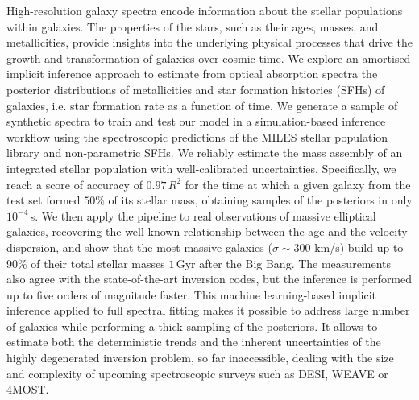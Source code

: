 \documentclass{aa}
\begin{document}
  \abstract
   {High-resolution galaxy spectra encode information about the stellar populations within galaxies. The properties of the stars, such as their ages, masses,  and metallicities, provide  insights into the underlying physical processes that drive the growth and transformation of galaxies over cosmic time.
    We explore an amortised implicit inference approach to estimate from optical absorption spectra the posterior distributions of metallicities and star formation histories (SFHs) of galaxies, i.e. star formation rate as a function of time. 
    We generate a sample of synthetic spectra to train and test our model in a simulation-based inference workflow using the spectroscopic predictions of the MILES stellar population library and non-parametric SFHs. We reliably estimate the mass assembly of an integrated stellar population with well-calibrated uncertainties. Specifically, we reach a score of accuracy of $0.97\,R^2$ for the time at which a given galaxy from the test set formed $50\%$ of its stellar mass, obtaining samples of the posteriors in only $10^{-4}$\,s. We then apply the pipeline to real observations of  massive elliptical galaxies, recovering the well-known relationship between the age and the velocity dispersion, and show that the most massive galaxies ($\sigma\sim300$ km/s) build up to 90\% of their total stellar masses $1$\,Gyr after the Big Bang. The measurements also agree with the state-of-the-art inversion codes, but the inference is performed up to five orders of magnitude faster.
    This machine learning-based implicit inference applied to full spectral fitting makes it possible to address large number of galaxies while performing a thick sampling of the posteriors. It allows to estimate both the deterministic trends and the inherent uncertainties of the highly degenerated inversion problem, so far inaccessible, dealing with the size and complexity of upcoming spectroscopic surveys such as DESI, WEAVE or 4MOST.}
    

   \maketitle
%




\end{document}
